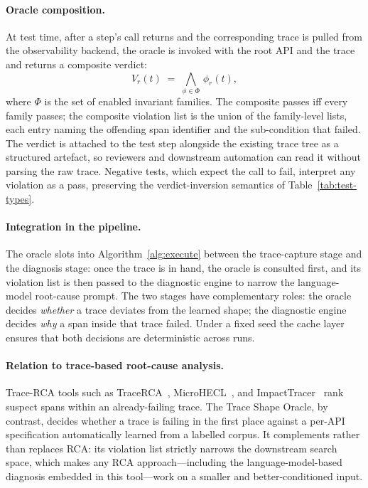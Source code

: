 \documentclass[conference]{IEEEtran}
\begin{document}
\paragraph{Oracle composition.}
At test time, after a step's call returns and the corresponding trace is pulled from the observability backend, the oracle is invoked with the root API and the trace and returns a composite verdict:
\[
  V_{r}(t) \;=\; \bigwedge_{\phi \in \Phi}\, \phi_{r}(t),
\]
where $\Phi$ is the set of enabled invariant families. The composite passes iff every family passes; the composite violation list is the union of the family-level lists, each entry naming the offending span identifier and the sub-condition that failed. The verdict is attached to the test step alongside the existing trace tree as a structured artefact, so reviewers and downstream automation can read it without parsing the raw trace. Negative tests, which expect the call to fail, interpret any violation as a pass, preserving the verdict-inversion semantics of Table~\ref{tab:test-types}.

\paragraph{Integration in the pipeline.}
The oracle slots into Algorithm~\ref{alg:execute} between the trace-capture stage and the diagnosis stage: once the trace is in hand, the oracle is consulted first, and its violation list is then passed to the diagnostic engine to narrow the language-model root-cause prompt. The two stages have complementary roles: the oracle decides \emph{whether} a trace deviates from the learned shape; the diagnostic engine decides \emph{why} a span inside that trace failed. Under a fixed seed the cache layer ensures that both decisions are deterministic across runs.

\paragraph{Relation to trace-based root-cause analysis.}
Trace-RCA tools such as TraceRCA~\cite{li2021tracerca}, MicroHECL~\cite{liu2021microhecl}, and ImpactTracer~\cite{xie2023impacttracer} rank suspect spans within an already-failing trace. The Trace Shape Oracle, by contrast, decides whether a trace is failing in the first place against a per-API specification automatically learned from a labelled corpus. It complements rather than replaces RCA: its violation list strictly narrows the downstream search space, which makes any RCA approach---including the language-model-based diagnosis embedded in this tool---work on a smaller and better-conditioned input.
\end{document}
